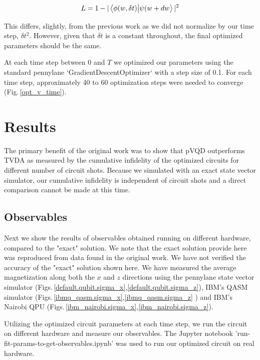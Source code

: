 \documentclass{article}
\begin{document}
\begin{equation}
    L = 1 - |\bra{\phi(w,\delta t)} \ket{\psi(w + dw}|^2
\end{equation}

This differs, slightly, from the previous work as we did not normalize by our time step, $\delta t^2$. However, given that $\delta t$ is a constant throughout, the final optimized parameters should be the same.

At each time step between 0 and $T$ we optimized our parameters using the standard pennylane `GradientDescentOptimizer` with a step size of 0.1. For each time step, approximately 40 to 60 optimization steps were needed to converge (Fig.\,\ref{opt_v_time}).

\section{Results}


The primary benefit of the original work was to show that pVQD outperforms TVDA as measured by the cumulative infidelity of the optimized circuits for different number of circuit shots. Because we simulated with an exact state vector simulator, our cumulative infidelity is independent of circuit shots and a direct comparison cannot be made at this time.

\subsection{Observables}

Next we show the results of observables obtained running on different hardware, compared to the "exact" solution. We note that the exact solution provide here was reproduced from data found in the original work. We have not verified the accuracy of the "exact" solution shown here. We have measured the average magnetization along both the $x$ and $z$ directions using the pennylane state vector simulator (Figs.\,\ref{default.qubit.sigma_x},\ref{default.qubit.sigma_z}), IBM's QASM simulator (Figs.\,\ref{ibmq_qasm.sigma_x},\ref{ibmq_qasm.sigma_z} ) and IBM's Nairobi QPU (Figs.\,\ref{ibm_nairobi.sigma_x},\ref{ibm_nairobi.sigma_z}).

Utilizing the optimized circuit parameters at each time step, we run the circuit on different hardware and measure our observables. The Jupyter notebook 'run-fit-params-to-get-observables.ipynb' was used to run our optimized circuit on real hardware.
\end{document}
